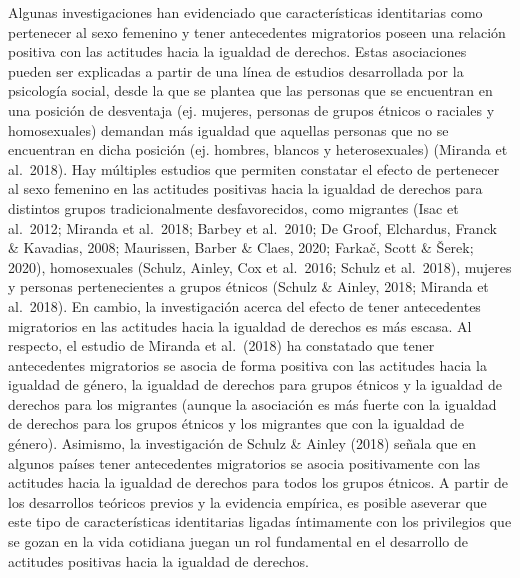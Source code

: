 \documentclass[12pt,twoside]{templates/facsothesis}
\begin{document}
Algunas investigaciones han evidenciado que características identitarias como pertenecer al sexo femenino y tener antecedentes migratorios poseen una relación positiva con las actitudes hacia la igualdad de derechos. Estas asociaciones pueden ser explicadas a partir de una línea de estudios desarrollada por la psicología social, desde la que se plantea que las personas que se encuentran en una posición de desventaja (ej. mujeres, personas de grupos étnicos o raciales y homosexuales) demandan más igualdad que aquellas personas que no se encuentran en dicha posición (ej. hombres, blancos y heterosexuales) (Miranda et al.~2018). Hay múltiples estudios que permiten constatar el efecto de pertenecer al sexo femenino en las actitudes positivas hacia la igualdad de derechos para distintos grupos tradicionalmente desfavorecidos, como migrantes (Isac et al.~2012; Miranda et al.~2018; Barbey et al.~2010; De Groof, Elchardus, Franck \& Kavadias, 2008; Maurissen, Barber \& Claes, 2020; Farkač, Scott \& Šerek; 2020), homosexuales (Schulz, Ainley, Cox et al.~2016; Schulz et al.~2018), mujeres y personas pertenecientes a grupos étnicos (Schulz \& Ainley, 2018; Miranda et al.~2018). En cambio, la investigación acerca del efecto de tener antecedentes migratorios en las actitudes hacia la igualdad de derechos es más escasa. Al respecto, el estudio de Miranda et al.~(2018) ha constatado que tener antecedentes migratorios se asocia de forma positiva con las actitudes hacia la igualdad de género, la igualdad de derechos para grupos étnicos y la igualdad de derechos para los migrantes (aunque la asociación es más fuerte con la igualdad de derechos para los grupos étnicos y los migrantes que con la igualdad de género). Asimismo, la investigación de Schulz \& Ainley (2018) señala que en algunos países tener antecedentes migratorios se asocia positivamente con las actitudes hacia la igualdad de derechos para todos los grupos étnicos. A partir de los desarrollos teóricos previos y la evidencia empírica, es posible aseverar que este tipo de características identitarias ligadas íntimamente con los privilegios que se gozan en la vida cotidiana juegan un rol fundamental en el desarrollo de actitudes positivas hacia la igualdad de derechos.
\end{document}
